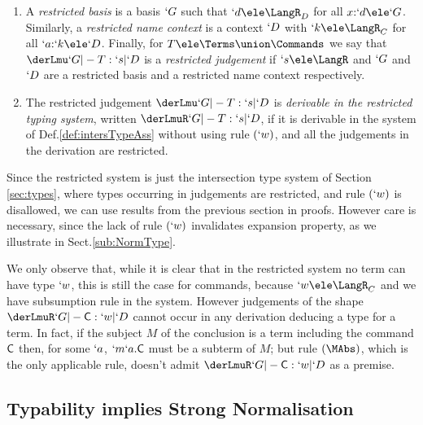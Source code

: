 \documentclass{CSML}
\begin{document}
 \begin{defi} 
 \label{def:restrictedTypingSystem}\hfill
 \begin{enumerate}
 \item
A \emph{restricted basis} is a basis $`G$ such that $`d \ele \LangR_D$ for all $x{:}`d \ele `G$. 
Similarly,
a \emph{restricted name context} is a context $`D $ with $`k \ele \LangR_C$ for all $`a{:}`k \ele `D $. 
Finally, for $T \ele \Terms \union \Commands$ we say that $ \derLmu `G |- T : `s | `D $ is a \emph{restricted judgement} if $`s \ele \LangR$ and
$`G$ and $`D $ are a restricted basis and a restricted name context respectively.

 \item
The restricted judgement $ \derLmu `G |- T : `s | `D $ is \emph{derivable in the restricted typing system}, written $ \derLmuR `G |- T: `s | `D $, if it is derivable 
in the system of Def.\skp\ref{def:intersTypeAss} without using rule $(`w)$, and all the judgements in the derivation are restricted.

 \end{enumerate}
 \end{defi}


\noindent Since the restricted system is just the intersection type system of Section\,\ref{sec:types}, where types occurring in judgements are restricted, and rule $(`w)$ is disallowed, we can use results from the previous section in proofs. 
However care is necessary, since the lack of rule $(`w)$ invalidates expansion property, as we illustrate in Sect.\skp\ref{sub:NormType}. 

We only observe that, while it is clear that in the restricted system no term can have type $`w$, this is still the case for commands, because $`w \ele \LangR_C$ and we have subsumption rule in the system. However judgements of the shape $\derLmuR `G |- \Cmd : `w | `D $ cannot occur in any derivation deducing a type for a term. 
In fact, if the subject $M$ of the conclusion is a term including the command $\textrm{\sf C}$ then,
for some $`a$, $`m`a.\textrm{\sf C}$ must be a subterm of $M$; but rule $(\MAbs)$, which is the only applicable rule, doesn't admit $\derLmuR `G |- \Cmd : `w | `D $ as a premise.

 \subsection{Typability implies Strong Normalisation} \label{subsec:type-SN}
\end{document}

